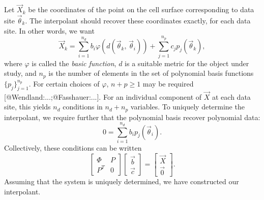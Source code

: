 Let $\vec{X}_k$ be the coordinates of the point on the cell surface
corresponding to data site $\vec{\theta}_k$. The interpolant should recover
these coordinates exactly, for each data site. In other words, we want
\begin{equation}
    \vec{X}_k = \sum_{i=1}^{n_d} b_i\varphi(d(\vec{\theta}_k,\,\vec{\theta}_i)) + \sum_{j=1}^{n_p} c_jp_j(\vec{\theta}_k),
\end{equation}
where $\varphi$ is called the \textit{basic function}, $d$ is a suitable metric
for the object under study, and $n_p$ is the number of elements in the set of
polynomial basis functions $\{p_j\}_{j=1}^{n_p}$. For certain choices of
$\varphi$, $n+p\ge 1$ may be required [@Wendland:...;@Fasshauer:...]. For an
individual component of $\vec{X}$ at each data site, this yields $n_d$
conditions in $n_d+n_p$ variables. To uniquely determine the interpolant, we
require further that the polynomial basis recover polynomial data:
\begin{equation}
    0 = \sum_{i=1}^{n_d} b_ip_j(\vec{\theta}_i).
\end{equation}
Collectively, these conditions can be written
\begin{equation}
    \label{eq:rbf-interpolant}
    \left[\begin{array}{cc}\Phi & P \\ P^T & 0\end{array}\right]
    \left[\begin{array}{c}\vec{b}\\\vec{c}\end{array}\right] =
    \left[\begin{array}{c}\vec{X}\\\vec{0}\end{array}\right].
\end{equation}
Assuming that the system is uniquely determined, we have constructed our
interpolant.

